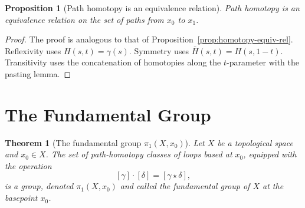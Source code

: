 \documentclass[12pt,a4paper,openany]{book}
\theoremstyle{definition}
\theoremstyle{plain}
\newtheorem{theorem}[definition]{Theorem}
\newtheorem{proposition}[definition]{Proposition}
\theoremstyle{remark}
\begin{document}
\begin{center}
\label{fig:path-homotopy}
\end{center}

\begin{proposition}[Path homotopy is an equivalence relation]\label{prop:path-homotopy-equiv}
Path homotopy is an equivalence relation on the set of paths from $x_0$ to $x_1$.
\end{proposition}

\begin{proof}
The proof is analogous to that of Proposition~\ref{prop:homotopy-equiv-rel}.
Reflexivity uses $H(s,t) = \gamma(s)$. Symmetry uses $\bar{H}(s,t) = H(s,
1-t)$. Transitivity uses the concatenation of homotopies along the $t$-parameter
with the pasting lemma.
\end{proof}


\section{The Fundamental Group}\label{sec:fundamental-group-def}

\begin{theorem}[{The fundamental group $\pi_1(X, x_0)$}]\label{thm:fundamental-group}
Let $X$ be a topological space and $x_0 \in X$. The set of path-homotopy
classes of loops based at $x_0$, equipped with the operation
\[
  [\gamma] \cdot [\delta] = [\gamma \star \delta],
\]
is a group, denoted $\pi_1(X, x_0)$ and called the
\emph{fundamental group} of $X$ at the basepoint $x_0$.
\end{theorem}
\end{document}
